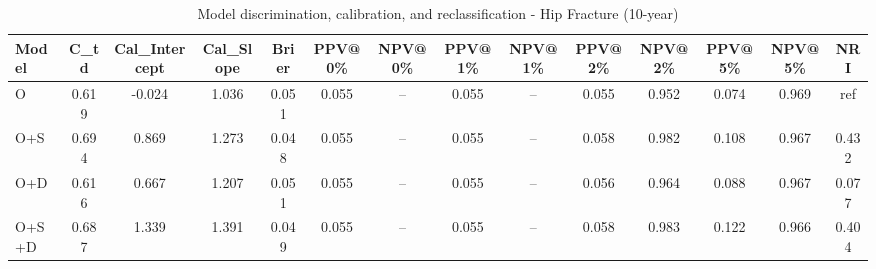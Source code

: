 \begin{table}[htbp]
\centering
\small
\caption{Model discrimination, calibration, and reclassification - Hip Fracture (10-year)}
\label{tab:perf_pd_10y}
\begin{tabular}{lccccccccccccc}
\toprule
Model & C\_td & Cal\_Intercept & Cal\_Slope & Brier & PPV@0\% & NPV@0\% & PPV@1\% & NPV@1\% & PPV@2\% & NPV@2\% & PPV@5\% & NPV@5\% & NRI \\
\midrule
O & 0.619 & -0.024 & 1.036 & 0.051 & 0.055 & -- & 0.055 & -- & 0.055 & 0.952 & 0.074 & 0.969 & ref \\
O+S & 0.694 & 0.869 & 1.273 & 0.048 & 0.055 & -- & 0.055 & -- & 0.058 & 0.982 & 0.108 & 0.967 & 0.432 \\
O+D & 0.616 & 0.667 & 1.207 & 0.051 & 0.055 & -- & 0.055 & -- & 0.056 & 0.964 & 0.088 & 0.967 & 0.077 \\
O+S+D & 0.687 & 1.339 & 1.391 & 0.049 & 0.055 & -- & 0.055 & -- & 0.058 & 0.983 & 0.122 & 0.966 & 0.404 \\
\bottomrule
\end{tabular}
\end{table}